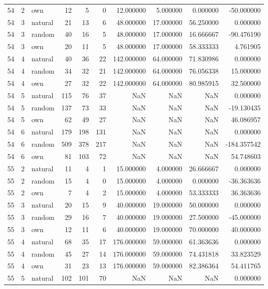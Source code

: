 \begin{table}[htbp]
\begin{tabular}{rrlrrrrrrr}
54 & 2 & own & 12 & 5 & 0 & 12.000000 & 5.000000 & 0.000000 & -50.000000 \\
54 & 3 & natural & 21 & 13 & 6 & 48.000000 & 17.000000 & 56.250000 & 0.000000 \\
54 & 3 & random & 40 & 16 & 5 & 48.000000 & 17.000000 & 16.666667 & -90.476190 \\
54 & 3 & own & 20 & 11 & 5 & 48.000000 & 17.000000 & 58.333333 & 4.761905 \\
54 & 4 & natural & 40 & 36 & 22 & 142.000000 & 64.000000 & 71.830986 & 0.000000 \\
54 & 4 & random & 34 & 32 & 21 & 142.000000 & 64.000000 & 76.056338 & 15.000000 \\
54 & 4 & own & 27 & 32 & 22 & 142.000000 & 64.000000 & 80.985915 & 32.500000 \\
54 & 5 & natural & 115 & 76 & 37 & NaN & NaN & NaN & 0.000000 \\
54 & 5 & random & 137 & 73 & 33 & NaN & NaN & NaN & -19.130435 \\
54 & 5 & own & 62 & 49 & 27 & NaN & NaN & NaN & 46.086957 \\
54 & 6 & natural & 179 & 198 & 131 & NaN & NaN & NaN & 0.000000 \\
54 & 6 & random & 509 & 378 & 217 & NaN & NaN & NaN & -184.357542 \\
54 & 6 & own & 81 & 103 & 72 & NaN & NaN & NaN & 54.748603 \\
55 & 2 & natural & 11 & 4 & 1 & 15.000000 & 4.000000 & 26.666667 & 0.000000 \\
55 & 2 & random & 15 & 4 & 0 & 15.000000 & 4.000000 & 0.000000 & -36.363636 \\
55 & 2 & own & 7 & 4 & 2 & 15.000000 & 4.000000 & 53.333333 & 36.363636 \\
55 & 3 & natural & 20 & 15 & 9 & 40.000000 & 19.000000 & 50.000000 & 0.000000 \\
55 & 3 & random & 29 & 16 & 7 & 40.000000 & 19.000000 & 27.500000 & -45.000000 \\
55 & 3 & own & 12 & 11 & 6 & 40.000000 & 19.000000 & 70.000000 & 40.000000 \\
55 & 4 & natural & 68 & 35 & 17 & 176.000000 & 59.000000 & 61.363636 & 0.000000 \\
55 & 4 & random & 45 & 27 & 14 & 176.000000 & 59.000000 & 74.431818 & 33.823529 \\
55 & 4 & own & 31 & 23 & 13 & 176.000000 & 59.000000 & 82.386364 & 54.411765 \\
55 & 5 & natural & 102 & 101 & 70 & NaN & NaN & NaN & 0.000000 \\

\end{tabular}
\end{table}
